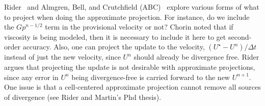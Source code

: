 Rider~\cite{rider} and Almgren, Bell, and Crutchfield (ABC)~\cite{ABC}
explore various forms of what to project when doing the approximate
projection.  For instance, do we include the $Gp^{n-1/2}$ term in the
provisional velocity or not?  Chorin noted that if viscosity is being
modeled, then it is necessary to include it here to get second-order
accuracy.  Also, one can project the update to the velocity, $(U^\star
- U^n)/\Delta t$ instead of just the new velocity, since $U^n$ should
already be divergence free.  Rider argues that projecting the update
is not desirable with approximate projections, since any error in
$U^n$ being divergence-free is carried forward to the new $U^{n+1}$.
One issue is that a cell-centered approximate projection cannot remove
all sources of divergence (see Rider and Martin's Phd thesis).

